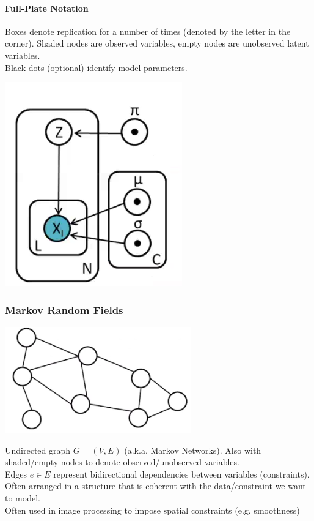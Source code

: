 \documentclass[10pt]{report}
\begin{document}
\paragraph{Full-Plate Notation}
Boxes denote replication for a number of times (denoted by the letter in the corner). Shaded nodes are observed variables, empty nodes are unobserved latent variables.\\
Black dots (optional) identify model parameters.
\begin{center}
	\includegraphics[scale=0.5]{17.png}
\end{center}
\subsubsection{Markov Random Fields}
\begin{center}
	\includegraphics[scale=0.5]{18.png}
\end{center}
Undirected graph $G = (V,E)$ (a.k.a. Markov Networks). Also with shaded/empty nodes to denote observed/unobserved variables.\\
Edges $e\in E$ represent bidirectional dependencies between variables (constraints).\\
Often arranged in a structure that is coherent with the data/constraint we want to model.\\
Often used in image processing to impose spatial constraints (e.g. smoothness)
\end{document}
